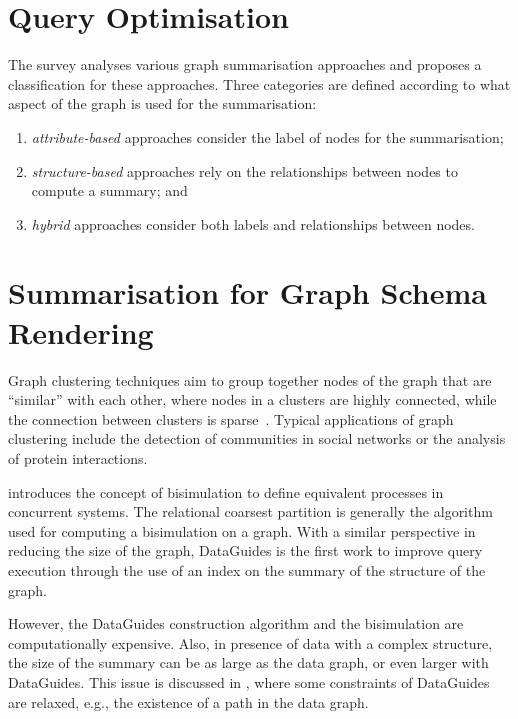 \section{Query Optimisation}


The survey \cite{you:2013:towards} analyses various graph summarisation approaches and proposes a classification for these approaches. Three categories are defined according to what aspect of the graph is used for the summarisation:
\begin{enumerate}
\item \emph{attribute-based} approaches consider the label of nodes for the summarisation;
\item \emph{structure-based} approaches rely on the relationships between nodes to compute a summary; and
\item \emph{hybrid} approaches consider both labels and relationships between nodes.
\end{enumerate}

\section{Summarisation for Graph Schema Rendering}

Graph clustering techniques aim to group together nodes of the graph that are ``similar'' with each other, where nodes in a clusters are highly connected, while the connection between clusters is sparse~\cite{Schaeffer:2007:SGC}. Typical applications of graph clustering include the detection of communities in social networks or the analysis of protein interactions.

\cite{Milner:1989:CC:534666} introduces the concept of bisimulation to define equivalent processes in concurrent systems. The relational coarsest partition \cite{Paige:1987:TPR:37185.37186} is generally the algorithm used for computing a bisimulation on a graph. With a similar perspective in reducing the size of the graph, DataGuides \cite{goldman1997dataguides} is the first work to improve query execution through the use of an index on the summary of the structure of the graph.

However, the DataGuides construction algorithm and the bisimulation are computationally expensive. Also, in presence of data with a complex structure, the size of the summary can be as large as the data graph, or even larger with DataGuides. This issue is discussed in \cite{goldman1999approximate}, where some constraints of DataGuides are relaxed, e.g., the existence of a path in the data graph.

